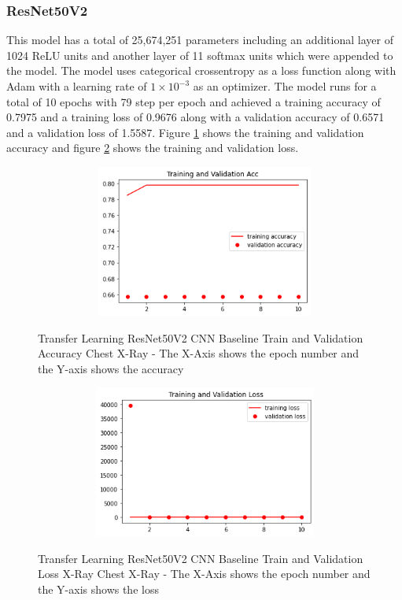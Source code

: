 \subsubsection{ResNet50V2}
This model has a total of 25,674,251 parameters including an additional layer of 1024 ReLU units and another layer of 11 softmax units which were appended to the model.  The model uses categorical crossentropy as a loss function along with Adam with a learning rate of $1 \times 10^{-3}$ as an optimizer.  The model runs for a total of 10 epochs with 79 step per epoch and achieved a training accuracy of 0.7975 and a training loss of 0.9676 along with a validation accuracy of 0.6571 and a validation loss of 1.5587. Figure \ref{fig:ResNet50V2 CNN Baseline Train and Validation Accuracy Chest X-Ray} shows the training and validation accuracy and figure \ref{fig:ResNet50V2 CNN Baseline Train and Validation Loss Chest X-Ray} shows the training and validation loss.
 \begin{figure}[H]
    \centering
    \includegraphics[width=1\textwidth,height=5cm,keepaspectratio]{Images/ResNet50V2BaselineTrainingValidationAccuracyChestX-Ray.png}\\
    \caption{Transfer Learning ResNet50V2 CNN Baseline Train and Validation Accuracy Chest X-Ray - The X-Axis shows the epoch number and the Y-axis shows the accuracy}
    \label{fig:ResNet50V2 CNN Baseline Train and Validation Accuracy Chest X-Ray}
\end{figure}
 \begin{figure}[H]
    \centering
    \includegraphics[width=1\textwidth,height=5cm,keepaspectratio]{Images/ResNet50V2BaselineTrainingValidationLossChestX-Ray.png}\\
    \caption{Transfer Learning ResNet50V2 CNN Baseline Train and Validation Loss X-Ray Chest X-Ray - The X-Axis shows the epoch number and the Y-axis shows the loss}
    \label{fig:ResNet50V2 CNN Baseline Train and Validation Loss Chest X-Ray}
\end{figure}
